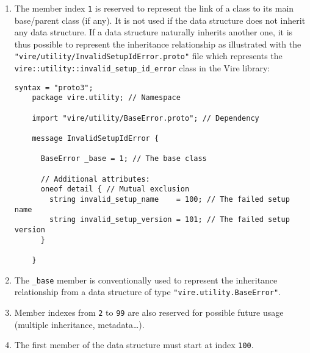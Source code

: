 \begin{enumerate}

\item
  The member index  \texttt{1} is reserved to represent the  link of a
  class to its main base/parent class (if any).  It is not used if the
  data structure does not inherit any data structure.
  If a data structure naturally inherits another one, it is thus possible
  to  represent the  inheritance  relationship as  illustrated with  the
  \texttt{"vire/utility/InvalidSetupIdError.proto"}      file      which
  represents the \texttt{vire::utility::invalid\_setup\_id\_error} class
  in the Vire library:

  \small
  \begin{Verbatim}[frame=single,xleftmargin=0.cm,label=\fbox{protobuf}]
    syntax = "proto3";
    package vire.utility; // Namespace

    import "vire/utility/BaseError.proto"; // Dependency

    message InvalidSetupIdError {

      BaseError _base = 1; // The base class

      // Additional attributes:
      oneof detail { // Mutual exclusion
        string invalid_setup_name    = 100; // The failed setup name
        string invalid_setup_version = 101; // The failed setup version
      }

    }
  \end{Verbatim}
  \normalsize

\item The  \texttt{\_base} member  is conventionally  used to  represent the
  inheritance   relationship    from   a   data   structure    of   type
  \texttt{"vire.utility.BaseError"}.

\item Member indexes from \texttt{2}  to \texttt{99} are also reserved
  for possible future usage (multiple inheritance, metadata\dots).

\item
  The first member of the data structure must start at index \texttt{100}.

\end{enumerate}

\vfill
\clearpage
\pagebreak

